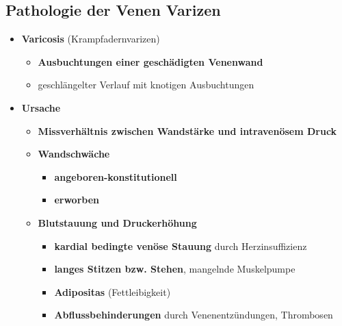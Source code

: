 \subsection{Pathologie der Venen Varizen}
	\begin{itemize}
		\item \textbf{Varicosis} (Krampfadernvarizen)
			\begin{itemize}
				\item \textbf{Ausbuchtungen einer geschädigten Venenwand}
				\item geschlängelter Verlauf mit knotigen Ausbuchtungen
			\end{itemize}
		\item \textbf{Ursache}
			\begin{itemize}
				\item \textbf{Missverhältnis zwischen Wandstärke und intravenösem Druck}
				\item \textbf{Wandschwäche}
					\begin{itemize}
						\item \textbf{angeboren-konstitutionell}
						\item \textbf{erworben}
					\end{itemize}
				\item \textbf{Blutstauung und Druckerhöhung}
					\begin{itemize}
						\item \textbf{kardial bedingte venöse Stauung} durch Herzinsuffizienz
						\item \textbf{langes Stitzen bzw. Stehen}, mangelnde Muskelpumpe
						\item \textbf{Adipositas} (Fettleibigkeit)
						\item \textbf{Abflussbehinderungen} durch Venenentzündungen, Thrombosen
					\end{itemize}
			\end{itemize}
	\end{itemize}
		
